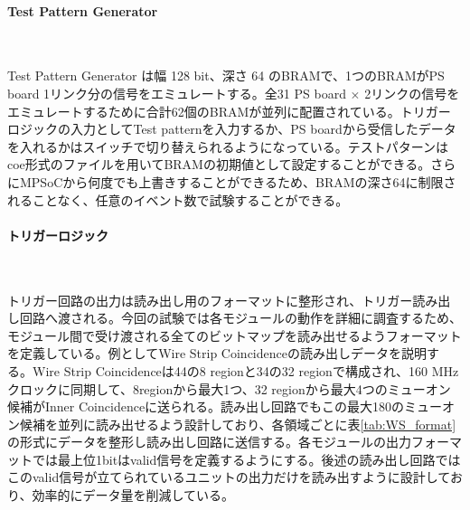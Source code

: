 \paragraph{Test Pattern Generator}　　
\par
Test Pattern Generator は幅 128 bit、深さ 64 のBRAMで、1つのBRAMがPS board 1リンク分の信号をエミュレートする。全31 PS board $\times$ 2リンクの信号をエミュレートするために合計62個のBRAMが並列に配置されている。トリガーロジックの入力としてTest patternを入力するか、PS boardから受信したデータを入れるかはスイッチで切り替えられるようになっている。テストパターンはcoe形式のファイルを用いてBRAMの初期値として設定することができる。さらにMPSoCから何度でも上書きすることができるため、BRAMの深さ64に制限されることなく、任意のイベント数で試験することができる。

\paragraph{トリガーロジック}　　
\par
トリガー回路の出力は読み出し用のフォーマットに整形され、トリガー読み出し回路へ渡される。今回の試験では各モジュールの動作を詳細に調査するため、モジュール間で受け渡される全てのビットマップを読み出せるようフォーマットを定義している。例としてWire Strip Coincidenceの読み出しデータを説明する。Wire Strip Coincidenceは44の8 regionと34の32 regionで構成され、160 MHzクロックに同期して、8regionから最大1つ、32 regionから最大4つのミューオン候補がInner Coincidenceに送られる。読み出し回路でもこの最大180のミューオン候補を並列に読み出せるよう設計しており、各領域ごとに表\ref{tab:WS_format}の形式にデータを整形し読み出し回路に送信する。各モジュールの出力フォーマットでは最上位1bitはvalid信号を定義するようにする。後述の読み出し回路ではこのvalid信号が立てられているユニットの出力だけを読み出すように設計しており、効率的にデータ量を削減している。

